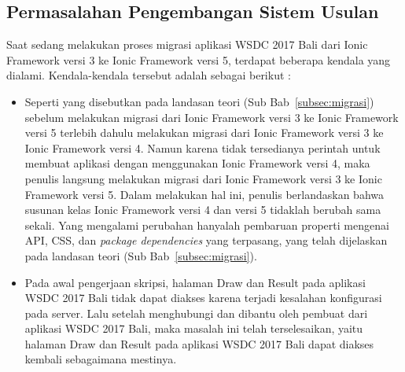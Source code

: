 %

\subsection{Permasalahan Pengembangan Sistem Usulan}
\label{sec:analisisPermasalahanSistemKini}
Saat sedang melakukan proses migrasi aplikasi WSDC 2017 Bali dari Ionic Framework versi 3 ke Ionic Framework versi 5, terdapat beberapa kendala yang dialami. Kendala-kendala tersebut adalah sebagai berikut : 
\begin{itemize}
	\item Seperti yang disebutkan pada landasan teori (Sub Bab~\ref{subsec:migrasi}) sebelum melakukan migrasi dari Ionic Framework versi 3 ke Ionic Framework versi 5 terlebih dahulu melakukan migrasi dari Ionic Framework versi 3 ke Ionic Framework versi 4. Namun karena tidak tersedianya perintah untuk membuat aplikasi dengan menggunakan Ionic Framework versi 4, maka penulis langsung melakukan migrasi dari Ionic Framework versi 3 ke Ionic Framework versi 5. Dalam melakukan hal ini, penulis berlandaskan bahwa susunan kelas Ionic Framework versi 4 dan versi 5 tidaklah berubah sama sekali. Yang mengalami perubahan hanyalah pembaruan properti mengenai API, CSS, dan {\it package dependencies} yang terpasang, yang telah dijelaskan pada landasan teori (Sub Bab~\ref{subsec:migrasi}).
	
	\item Pada awal pengerjaan skripsi, halaman Draw dan Result pada aplikasi WSDC 2017 Bali tidak dapat diakses karena terjadi kesalahan konfigurasi pada server. Lalu setelah menghubungi dan dibantu oleh pembuat dari aplikasi WSDC 2017 Bali, maka masalah ini telah terselesaikan, yaitu halaman Draw dan Result pada aplikasi WSDC 2017 Bali dapat diakses kembali sebagaimana mestinya.
\end{itemize}
